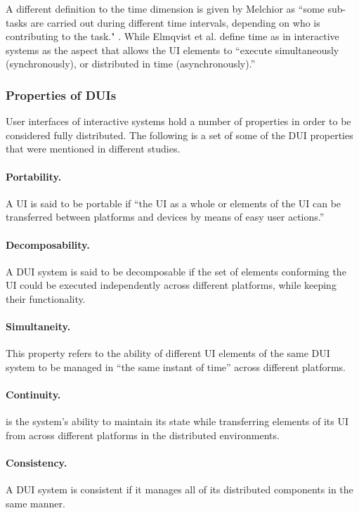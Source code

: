 A different definition to the time dimension is given by Melchior as ``some
sub-tasks are carried out during different time intervals, depending on who is contributing to the task." \cite{melchior2011distributed}. While Elmqvist et al.
\cite{elmqvist2011distributed} define time as in interactive systems as the
aspect that allows the UI elements to ``execute simultaneously
(synchronously), or distributed in time (asynchronously).''

\subsubsection{Properties of DUIs}
User interfaces of interactive systems hold a number of properties
in order to be considered fully distributed. The following is a set of
some of the DUI properties that were mentioned in different studies.

\paragraph{Portability.}  A UI is said to be portable if ``the UI as a whole or elements of the UI can be transferred between platforms and
devices by means of easy user actions.'' \cite{lopez2011formal}
\paragraph{Decomposability.} A DUI system is said to be decomposable if the set
of elements conforming the UI could be executed independently across different
platforms, while keeping their functionality.\cite{lopez2011formal}
\paragraph{Simultaneity.} This property refers to
the ability of different UI elements of the same DUI system to be managed in
``the same instant of time'' across different platforms.
\cite{lopez2011formal}
\paragraph{Continuity.} is the system's ability to maintain
its state while transferring elements of its UI from across different platforms
in the distributed environments.\cite{lopez2011formal}
\paragraph{Consistency.} A DUI system is consistent if it manages all of its
distributed components in the same manner.\cite{lopez2011formal}
